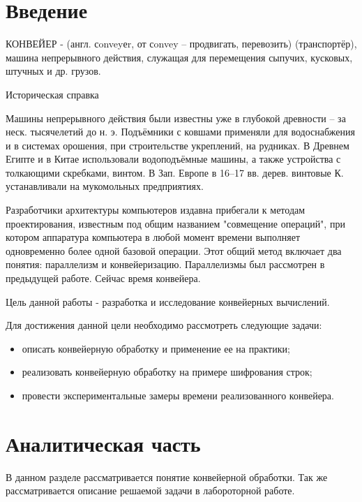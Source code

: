 \documentclass[12pt,a4paper]{report}
\begin{document}
	
	\tableofcontents


\newpage
\chapter*{Введение}

КОНВЕЙЕР - (англ. сonveyеr, от сonvey – продвигать, перевозить) (транспортёр), машина непрерывного действия, служащая для перемещения сыпучих, кусковых, штучных и др. грузов. 

Историческая справка

Машины непрерывного действия были известны уже в глубокой древности – за неск. тысячелетий до н. э. Подъёмники с ковшами применяли для водоснабжения и в системах орошения, при строительстве укреплений, на рудниках. В Древнем Египте и в Китае использовали водоподъёмные машины, а также устройства с толкающими скребками, винтом. В Зап. Европе в 16–17 вв. дерев. винтовые К. устанавливали на мукомольных предприятиях.

Разработчики архитектуры компьютеров издавна прибегали к методам проектирования, известным под общим названием "совмещение операций", при котором аппаратура компьютера в любой момент времени выполняет одновременно более одной базовой операции. Этот общий метод включает два понятия: параллелизм и конвейеризацию. Параллелизмы был рассмотрен в предыдущей работе.
Сейчас время конвейера.



Цель данной работы - разработка и исследование конвейерных вычислений.

Для достижения данной цели необходимо рассмотреть следующие задачи:
\begin{itemize}
	\item описать конвейерную обработку и применение ее на практики;
	\item реализовать конвейерную обработку на примере шифрования строк;
	\item провести экспериментальные замеры времени реализованного конвейера.
\end{itemize}

\newpage
\chapter{Аналитическая часть}

В данном разделе рассматривается понятие конвейерной обработки.
Так же рассматривается описание решаемой задачи в лабороторной работе.
\end{document}
